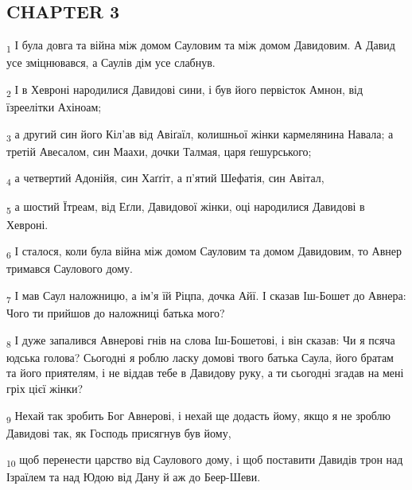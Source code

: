\subsection{CHAPTER 3}
\begin{tcolorbox}
\textsubscript{1} І була довга та війна між домом Сауловим та між домом Давидовим. А Давид усе зміцнювався, а Саулів дім усе слабнув.
\end{tcolorbox}
\begin{tcolorbox}
\textsubscript{2} І в Хевроні народилися Давидові сини, і був його первісток Амнон, від їзреелітки Ахіноам;
\end{tcolorbox}
\begin{tcolorbox}
\textsubscript{3} а другий син його Кіл'ав від Авіґаїл, колишньої жінки кармелянина Навала; а третій Авесалом, син Маахи, дочки Талмая, царя ґешурського;
\end{tcolorbox}
\begin{tcolorbox}
\textsubscript{4} а четвертий Адонійя, син Хаґґіт, а п'ятий Шефатія, син Авітал,
\end{tcolorbox}
\begin{tcolorbox}
\textsubscript{5} а шостий Їтреам, від Еґли, Давидової жінки, оці народилися Давидові в Хевроні.
\end{tcolorbox}
\begin{tcolorbox}
\textsubscript{6} І сталося, коли була війна між домом Сауловим та домом Давидовим, то Авнер тримався Саулового дому.
\end{tcolorbox}
\begin{tcolorbox}
\textsubscript{7} І мав Саул наложницю, а ім'я їй Ріцпа, дочка Айї. І сказав Іш-Бошет до Авнера: Чого ти прийшов до наложниці батька мого?
\end{tcolorbox}
\begin{tcolorbox}
\textsubscript{8} І дуже запалився Авнерові гнів на слова Іш-Бошетові, і він сказав: Чи я псяча юдська голова? Сьогодні я роблю ласку домові твого батька Саула, його братам та його приятелям, і не віддав тебе в Давидову руку, а ти сьогодні згадав на мені гріх цієї жінки?
\end{tcolorbox}
\begin{tcolorbox}
\textsubscript{9} Нехай так зробить Бог Авнерові, і нехай ще додасть йому, якщо я не зроблю Давидові так, як Господь присягнув був йому,
\end{tcolorbox}
\begin{tcolorbox}
\textsubscript{10} щоб перенести царство від Саулового дому, і щоб поставити Давидів трон над Ізраїлем та над Юдою від Дану й аж до Беер-Шеви.
\end{tcolorbox}
